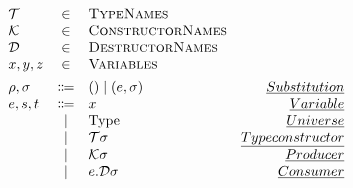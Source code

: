 \[
\begin{array}{lclr}
    \mathcal{T} &\in &\textsc{TypeNames} & \\
    \mathcal{K} &\in &\textsc{ConstructorNames} & \\
    \mathcal{D} &\in &\textsc{DestructorNames} & \\
    x,y,z &\in &\textsc{Variables} & \\[0.15cm]
    \rho, \sigma &\Coloneqq & () \mid (e,\sigma) & \emph{Substitution} \\
    e,s,t &\Coloneqq & x & \emph{Variable} \\
    & \mid & \text{Type} & \emph{Universe} \\
    & \mid & \mathcal{T}\sigma & \emph{Type constructor} \\
    & \mid & \mathcal{K}\sigma & \emph{Producer} \\
    & \mid & e.\mathcal{D}\sigma & \emph{Consumer} \\
\end{array}
\]